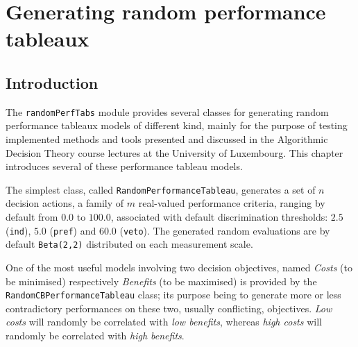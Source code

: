 \chapter{Generating random performance tableaux}
\label{sec:6}



\section{Introduction}
\label{sec:6.1}

The \texttt{randomPerfTabs} module provides several classes for generating random performance tableaux models of different kind, mainly for the purpose of testing implemented methods and tools presented and discussed in the Algorithmic Decision Theory course lectures at the University of Luxembourg. This chapter introduces several of these performance tableau models.

The simplest class, called \texttt{RandomPerformanceTableau}, generates a set of $n$ decision actions, a family of $m$ real-valued performance criteria, ranging by default from $0.0$ to $100.0$, associated with default discrimination thresholds: $2.5$ (\texttt{ind}), $5.0$ (\texttt{pref}) and $60.0$ (\texttt{veto}). The generated random evaluations are by default \texttt{Beta(2,2)} distributed on each measurement scale.

One of the most useful models involving two decision objectives, named \emph{Costs} (to be minimised) respectively \emph{Benefits} (to be maximised) is provided by the  \texttt{RandomCBPerformanceTableau} class; its purpose being to generate more or less contradictory performances on these two, usually conflicting, objectives. \emph{Low costs} will randomly be correlated with \emph{low benefits}, whereas \emph{high costs} will randomly be correlated with \emph{high benefits}.

